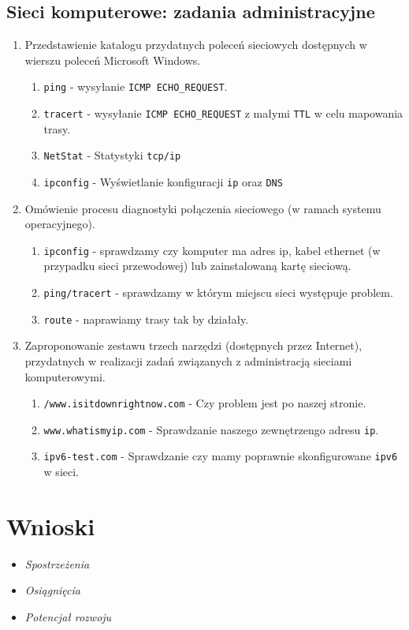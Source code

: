 \documentclass[12pt,a4paper]{article}
\begin{document}
\subsection{Sieci komputerowe: zadania administracyjne}

\begin{enumerate}
    \item Przedstawienie katalogu przydatnych poleceń sieciowych dostępnych w
        wierszu poleceń Microsoft Windows. \begin{enumerate}
            \item \texttt{ping} - wysyłanie \texttt{ICMP ECHO\_REQUEST}.
            \item \texttt{tracert} - wysyłanie \texttt{ICMP ECHO\_REQUEST} z
                małymi \texttt{TTL} w celu mapowania trasy.
            \item \texttt{NetStat} - Statystyki \texttt{tcp/ip}
            \item \texttt{ipconfig} - Wyświetlanie konfiguracji \texttt{ip} oraz
                \texttt{DNS}
        \end{enumerate}
    \item Omówienie procesu diagnostyki połączenia sieciowego (w ramach
        systemu operacyjnego). \begin{enumerate}
            \item \texttt{ipconfig} - sprawdzamy czy komputer ma adres ip, kabel
                ethernet (w przypadku sieci przewodowej) lub zainstalowaną kartę 
                sieciową. 
            \item \texttt{ping/tracert} - sprawdzamy w którym miejscu sieci
                występuje problem.
            \item \texttt{route} - naprawiamy trasy tak by działały.
        \end{enumerate}
    \item Zaproponowanie zestawu trzech narzędzi (dostępnych przez Internet),
        przydatnych w realizacji zadań związanych z administracją sieciami 
        komputerowymi. \begin{enumerate}
            \item \texttt{/www.isitdownrightnow.com} - Czy problem jest po
                naszej stronie.
            \item \texttt{www.whatismyip.com} - Sprawdzanie naszego zewnętrzengo
                adresu \texttt{ip}.
            \item \texttt{ipv6-test.com} - Sprawdzanie czy mamy poprawnie
                skonfigurowane \texttt{ipv6} w sieci.
        \end{enumerate}
\end{enumerate}

\newpage
\section{Wnioski}

\begin{itemize}
\item \textit{Spostrzeżenia}
\item \textit{Osiągnięcia}
\item \textit{Potencjał rozwoju}
\end{itemize}
\end{document}
